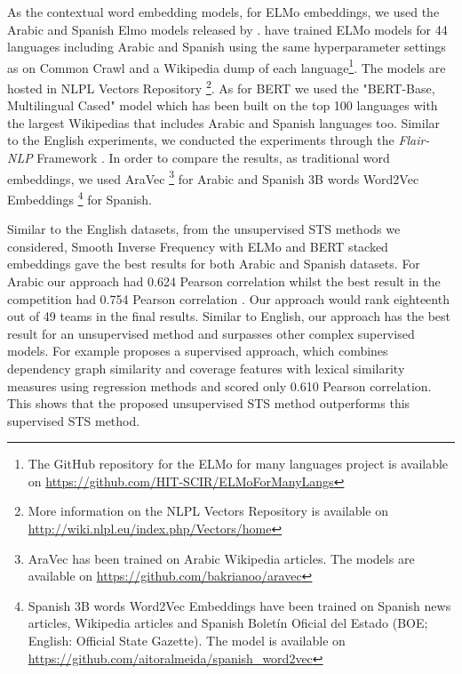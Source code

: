 As the contextual word embedding models, for ELMo embeddings, we used the Arabic and Spanish Elmo models released by \citet{che-EtAl:2018:K18-2}. \citet{che-EtAl:2018:K18-2} have trained ELMo models for 44 languages including Arabic and Spanish using the same hyperparameter settings as \citet{peters-etal-2018-deep} on Common Crawl and a Wikipedia dump of each language\footnote{The GitHub repository for the ELMo for many languages project is available on \url{https://github.com/HIT-SCIR/ELMoForManyLangs}}. The models are hosted in NLPL Vectors Repository \cite{fares-etal-2017-word}\footnote{More information on the NLPL Vectors Repository is available on \url{http://wiki.nlpl.eu/index.php/Vectors/home}}. As for BERT we used the "BERT-Base, Multilingual Cased" model \cite{devlin-etal-2019-bert} which has been built on the top 100 languages with the largest Wikipedias that includes Arabic and Spanish languages too. Similar to the English experiments, we conducted the experiments through the \textit{Flair-NLP} Framework \cite{akbik-etal-2019-flair}. In order to compare the results, as traditional word embeddings,  we used AraVec \cite{SOLIMAN2017256} \footnote{AraVec has been trained on Arabic Wikipedia articles. The models are available on \url{https://github.com/bakrianoo/aravec}} for Arabic and Spanish 3B words Word2Vec Embeddings \cite{doi:10.1177/1550147718811827}\footnote{Spanish 3B words Word2Vec Embeddings have been trained on Spanish news articles, Wikipedia articles and Spanish Boletín Oficial del Estado (BOE; English: Official State Gazette). The model is available on \url{https://github.com/aitoralmeida/spanish_word2vec}} for Spanish.

Similar to the English datasets, from the unsupervised STS methods we considered, Smooth Inverse Frequency with ELMo and BERT stacked embeddings gave the best results for both Arabic and Spanish datasets. For Arabic our approach had 0.624 Pearson correlation whilst the best result \cite{wu-etal-2017-bit} in the competition had 0.754 Pearson correlation \cite{cer-etal-2017-semeval}. Our approach would rank eighteenth out of 49 teams in the final results. Similar to English, our approach has the best result for an unsupervised method and surpasses other complex supervised models. For example \citet{kohail-etal-2017-sts} proposes a supervised approach, which combines dependency graph similarity and coverage features with lexical similarity measures using regression methods and scored only 0.610 Pearson correlation. This shows that the proposed unsupervised STS method outperforms this supervised STS method.


